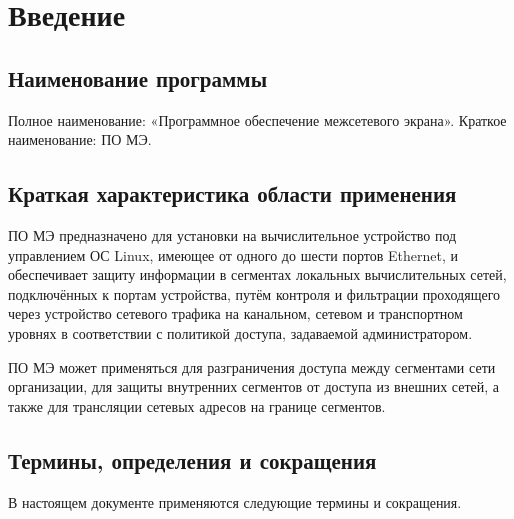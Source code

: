 \documentclass[12pt,a4paper,final]{article}
\begin{document}
\section{Введение}

\subsection{Наименование программы}

Полное наименование: «Программное обеспечение межсетевого экрана».
Краткое наименование: ПО МЭ.

\subsection{Краткая характеристика области применения}

ПО МЭ предназначено для установки на вычислительное устройство под управлением
ОС Linux, имеющее от одного до шести портов Ethernet, и обеспечивает защиту
информации в сегментах локальных вычислительных сетей, подключённых к портам
устройства, путём контроля и фильтрации проходящего через устройство сетевого
трафика на канальном, сетевом и транспортном уровнях в соответствии с политикой
доступа, задаваемой администратором.

ПО МЭ может применяться для разграничения доступа между сегментами сети
организации, для защиты внутренних сегментов от доступа из внешних сетей,
а также для трансляции сетевых адресов на границе сегментов.

\subsection{Термины, определения и сокращения}

В настоящем документе применяются следующие термины и сокращения.
\end{document}
